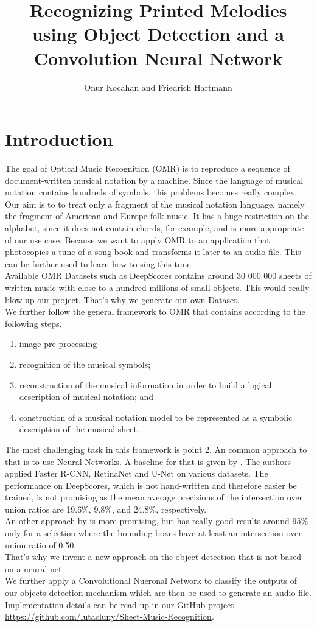 \documentclass[twocolumn]{article}
\title{Recognizing Printed Melodies using Object Detection and a Convolution Neural Network}
\author{Onur Kocahan and Friedrich Hartmann}
\begin{document}
 
\maketitle
\section{Introduction}
The goal of Optical Music Recognition (OMR) is to reproduce a sequence of document-written musical notation by a machine. Since the language of musical notation contains hundreds of symbols, this problems becomes really complex. \\
Our aim is to to treat only a fragment of the musical notation language, namely the fragment of American and Europe folk music. It has a huge restriction on the alphabet, since it does not contain chords, for example, and is more appropriate of our use case. Because we want to apply OMR to an application that photocopies a tune of a song-book and transforms it later to an audio file. This can be further used to learn how to sing this tune.  \\
Available OMR Datasets such as DeepScores \citep{DeepScores} contains around 30 000 000 sheets of written music with close to a hundred millions of small objects. This would really blow up our project. That's why we generate our own Dataset. \\
We further follow the general framework to OMR that contains according to \citet{state_of_the_art} the following steps. 
\begin{enumerate}
 \item image pre-processing
 \item recognition of the musical symbols;
 \item reconstruction of the musical information in order to build a logical description of musical notation; and
 \item construction of a musical notation model to be represented as a symbolic description of the musical sheet.
\end{enumerate}
The most challenging task in this framework is point 2. An common approach to that is to use Neural Networks. A baseline for that is given by \citet{Baseline}. The authors applied Faster R-CNN, RetinaNet and U-Net on various datasets. The performance on DeepScores, which is not hand-written and therefore easier be trained, is not promising as the mean average precisions of the intersection over union ratios are 19.6\%, 9.8\%, and 24.8\%, respectively. \\
An other approach by \citet{GitHub_OMR} is more promising, but has really good results around 95\% only for a selection where the bounding boxes have at least an intersection over union ratio of 0.50. \\
That's why we invent a new approach on the object detection that is not based on a neural net.\\ We further apply a Convolutional Nueronal Network to classify the outputs of our objects detection mechanism which are then be used to generate an audio file. \\
Implementation details can be read up in our GitHub project \url{https://github.com/lutacluny/Sheet-Music-Recognition}.
\end{document}

